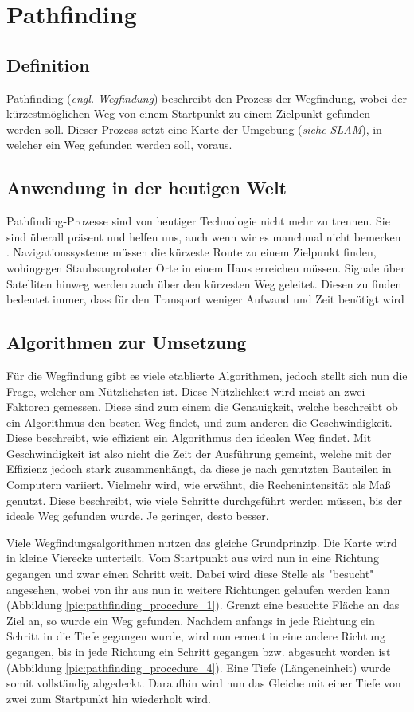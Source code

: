 \section{Pathfinding}
{
	\subsection{Definition}
	{
		Pathfinding (\textit{engl. Wegfindung}) beschreibt den Prozess der Wegfindung, wobei der kürzestmöglichen Weg von einem Startpunkt zu einem Zielpunkt gefunden werden soll. Dieser Prozess setzt eine Karte der Umgebung (\textit{siehe SLAM}), in welcher ein Weg gefunden werden soll, voraus.
	}

	\subsection{Anwendung in der heutigen Welt}
	{
		Pathfinding-Prozesse sind von heutiger Technologie nicht mehr zu trennen. Sie sind überall präsent und helfen uns, auch wenn wir es manchmal nicht bemerken . Navigationssysteme müssen die kürzeste Route zu einem Zielpunkt finden, wohingegen Staubsaugroboter Orte in einem Haus erreichen müssen. Signale über Satelliten hinweg werden auch über den kürzesten Weg geleitet. Diesen zu finden bedeutet immer, dass für den Transport weniger Aufwand und Zeit benötigt wird
	}

	\subsection{Algorithmen zur Umsetzung}
	{
		Für die Wegfindung gibt es viele etablierte Algorithmen, jedoch stellt sich nun die Frage, welcher am Nützlichsten ist. Diese Nützlichkeit wird meist an zwei Faktoren gemessen. Diese sind zum einem die Genauigkeit, welche beschreibt ob ein Algorithmus den besten Weg findet, und zum anderen die Geschwindigkeit. Diese beschreibt, wie effizient ein Algorithmus den idealen Weg findet. Mit Geschwindigkeit ist also nicht die Zeit der Ausführung gemeint, welche mit der Effizienz jedoch stark zusammenhängt, da diese je nach genutzten Bauteilen in Computern variiert. Vielmehr wird, wie erwähnt, die Rechenintensität als Maß genutzt. Diese beschreibt, wie viele Schritte durchgeführt werden müssen, bis der ideale Weg gefunden wurde. Je geringer, desto besser. 
		
		Viele Wegfindungsalgorithmen nutzen das gleiche Grundprinzip. Die Karte wird in kleine Vierecke unterteilt. Vom Startpunkt aus wird nun in eine Richtung gegangen und zwar einen Schritt weit. Dabei wird diese Stelle als "besucht" angesehen, wobei von ihr aus nun in weitere Richtungen gelaufen werden kann (Abbildung \ref{pic:pathfinding_procedure_1}). Grenzt eine besuchte Fläche an das Ziel an, so wurde ein Weg gefunden. Nachdem anfangs in jede Richtung ein Schritt in die Tiefe gegangen wurde, wird nun erneut in eine andere Richtung gegangen, bis in jede Richtung ein Schritt gegangen bzw. abgesucht worden ist (Abbildung \ref{pic:pathfinding_procedure_4}). Eine Tiefe (Längeneinheit) wurde somit vollständig abgedeckt. Daraufhin wird nun das Gleiche mit einer Tiefe von zwei zum Startpunkt hin wiederholt wird.
		
}}
